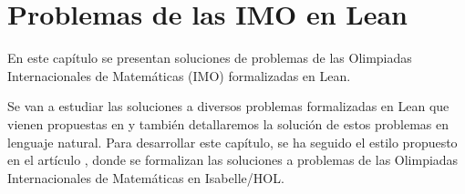 \chapter{Problemas de las IMO en Lean}

En este capítulo se presentan soluciones de problemas de las Olimpiadas
Internacionales de Matemáticas (IMO) formalizadas en Lean.

Se van a estudiar las soluciones a diversos problemas formalizadas en
Lean que vienen propuestas en \cite{IM} y también detallaremos la solución
de estos problemas en lenguaje natural. Para desarrollar este capítulo,
se ha seguido el estilo propuesto en el artículo \cite{ART}, donde se
formalizan las soluciones a problemas de las Olimpiadas Internacionales
de Matemáticas en Isabelle/HOL.




